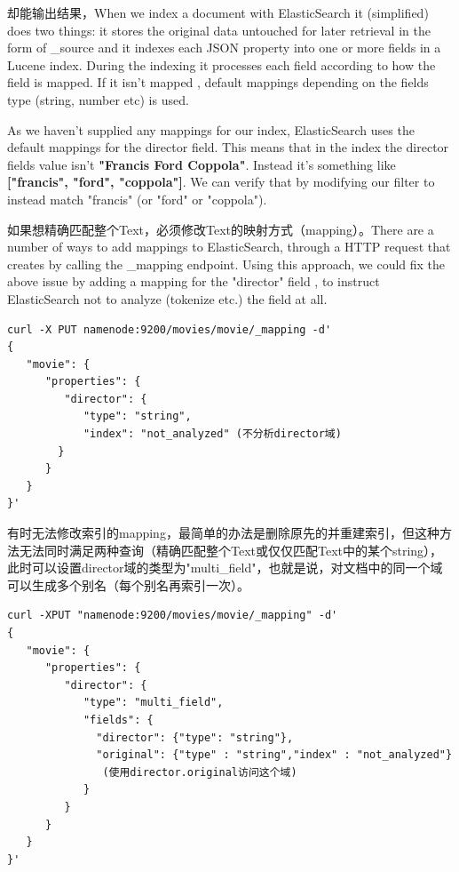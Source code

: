 \par 却能输出结果，When we index a document with ElasticSearch it (simplified) does two things: it stores the original data untouched for later retrieval in the form of \_source and it indexes each JSON property into one or more fields in a Lucene index. During the indexing it processes each field according to how the field is mapped. If it isn't mapped , default mappings depending on the fields type (string, number etc) is used.
\par As we haven't supplied any mappings for our index, ElasticSearch uses the default mappings for the director field. This means that in the index the director fields value isn't \textbf{"Francis Ford Coppola"}. Instead it's something like \textbf{["francis", "ford", "coppola"]}. We can verify that by modifying our filter to instead match "francis" (or "ford" or "coppola").
\par 如果想精确匹配整个Text，必须修改Text的映射方式（mapping）。There are a number of ways to add mappings to ElasticSearch, through a HTTP request that creates by calling the \_mapping endpoint. Using this approach, we could fix the above issue by adding a mapping for the "director" field , to instruct ElasticSearch not to analyze (tokenize etc.) the field at all.
\begin{verbatim}
curl -X PUT namenode:9200/movies/movie/_mapping -d'
{
   "movie": {
      "properties": {
         "director": {
            "type": "string",
            "index": "not_analyzed" (不分析director域)
        }
      }
   }
}'
\end{verbatim}
\par 有时无法修改索引的mapping，最简单的办法是删除原先的并重建索引，但这种方法无法同时满足两种查询（精确匹配整个Text或仅仅匹配Text中的某个string），此时可以设置director域的类型为"multi\_field"，也就是说，对文档中的同一个域可以生成多个别名（每个别名再索引一次）。
\begin{verbatim}
curl -XPUT "namenode:9200/movies/movie/_mapping" -d'
{
   "movie": {
      "properties": {
         "director": {
            "type": "multi_field",
            "fields": {
              "director": {"type": "string"},
              "original": {"type" : "string","index" : "not_analyzed"}
               (使用director.original访问这个域)
            }
         }
      }
   }
}'
\end{verbatim}
